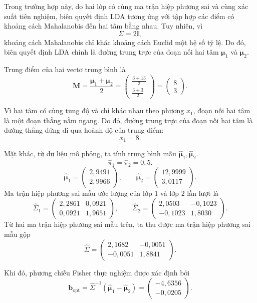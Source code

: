 Trong trường hợp này, do hai lớp có cùng ma trận hiệp phương sai và cùng xác suất tiên nghiệm, biên quyết định LDA tương ứng với tập hợp các điểm có khoảng cách Mahalanobis đến hai tâm bằng nhau. Tuy nhiên, vì
\[
\Sigma=2\mathbb{I},
\]
khoảng cách Mahalanobis chỉ khác khoảng cách Euclid một hệ số tỷ lệ. Do đó, biên quyết định LDA chính là đường trung trực của đoạn nối hai tâm $\bm{\mu}_1$ và $\bm{\mu}_2$.


Trung điểm của hai vectơ trung bình là
\[
\bm{M}
=
\frac{\bm{\mu}_1+\bm{\mu}_2}{2}
=
\begin{pmatrix}
	\frac{3+13}{2}\\
	\frac{3+3}{2}
\end{pmatrix}
=
\begin{pmatrix}
	8\\
	3
\end{pmatrix}.
\]

Vì hai tâm có cùng tung độ và chỉ khác nhau theo phương $x_1$, đoạn nối hai tâm là một đoạn thẳng nằm ngang. Do đó, đường trung trực của đoạn nối hai tâm là đường thẳng đứng đi qua hoành độ của trung điểm:
\[
x_1=8.
\]

Mặt khác, từ dữ liệu mô phỏng, ta tính trung bình mẫu \(\hat{\bm{\mu}}_1, \hat{\bm{\mu}}_2\). 
\[
\hat{\pi}_1=\hat{\pi}_2=0{,}5.
\]
\[
\hat{\bm{\mu}}_1
=
\begin{pmatrix}
	2{,}9491\\
	2{,}9966
\end{pmatrix},
\qquad
\hat{\bm{\mu}}_2
=
\begin{pmatrix}
	12{,}9999\\
	3{,}0117
\end{pmatrix}.
\]
Ma trận hiệp phương sai mẫu ước lượng của lớp $1$ và lớp $2$ lần lượt là \[ \hat{\Sigma}_1 = \begin{pmatrix} 2{,}2861 & 0{,}0921\\ 0{,}0921 & 1{,}9651 \end{pmatrix}, \qquad \hat{\Sigma}_2 = \begin{pmatrix} 2{,}0503 & -0{,}1023\\ -0{,}1023 & 1{,}8030 \end{pmatrix}. \] Từ hai ma trận hiệp phương sai mẫu trên, ta thu được ma trận hiệp phương sai mẫu gộp \[ \hat{\Sigma} = \begin{pmatrix} 2{,}1682 & -0{,}0051\\ -0{,}0051 & 1{,}8841 \end{pmatrix}. \]

Khi đó, phương chiếu Fisher thực nghiệm được xác định bởi
\[
\bm{b}_{\text{opt}}
=
\hat{\Sigma}^{-1}
(\hat{\bm{\mu}}_1-\hat{\bm{\mu}}_2)
=
\begin{pmatrix}
	-4{,}6356\\
	-0{,}0205
\end{pmatrix}.
\]

